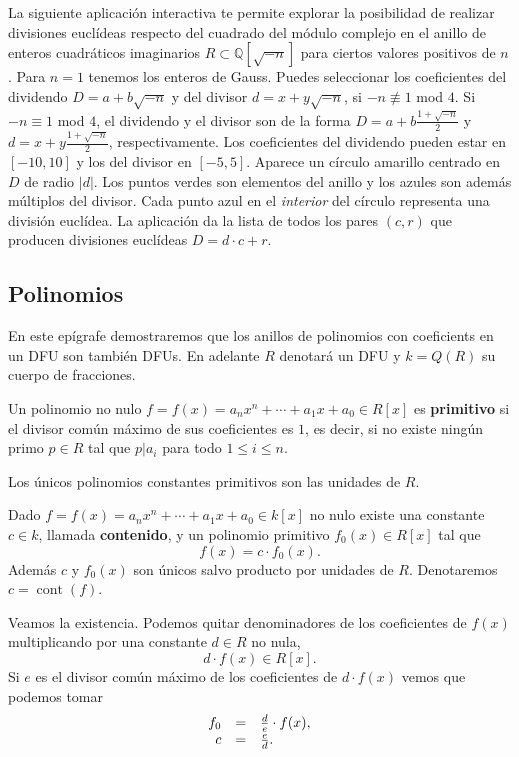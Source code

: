 La siguiente aplicación interactiva te permite explorar la posibilidad
de realizar divisiones euclídeas respecto del cuadrado del módulo
complejo en el anillo de enteros cuadráticos imaginarios
\(R\subset\mathbb Q[\sqrt{-n}]\) para ciertos valores positivos de
\(n\). Para \(n=1\) tenemos los enteros de Gauss. Puedes seleccionar los
coeficientes del dividendo \(D=a+b\sqrt{-n}\) y del divisor
\(d=x+y\sqrt{-n}\), si \(-n\not\equiv 1\) mod \(4\). Si \(-n\equiv 1\)
mod \(4\), el dividendo y el divisor son de la forma
\(D=a+b\frac{1+\sqrt{-n}}{2}\) y \(d=x+y\frac{1+\sqrt{-n}}{2}\),
respectivamente. Los coeficientes del dividendo pueden estar en
\([-10,10]\) y los del divisor en \([-5,5]\). Aparece un círculo
amarillo centrado en \(D\) de radio \(|d|\). Los puntos verdes son
elementos del anillo y los azules son además múltiplos del divisor. Cada
punto azul en el \emph{interior} del círculo representa una división
euclídea. La aplicación da la lista de todos los pares \((c,r)\) que
producen divisiones euclídeas \(D=d\cdot c+r\).

\hypertarget{polinomios}{%
\subsection{Polinomios}\label{polinomios}}

En este epígrafe demostraremos que los anillos de polinomios con
coeficients en un DFU son también DFUs. En adelante \(R\) denotará un
DFU y \(k=Q( R )\) su cuerpo de fracciones.


Un polinomio no nulo \(f=f(x)=a_nx^n+\cdots+a_1x+a_0\in R[x]\) es
\textbf{primitivo} si el divisor común máximo de sus coeficientes es
\(1\), es decir, si no existe ningún primo \(p\in R\) tal que \(p|a_i\)
para todo \(1\leq i\leq n\). 

Los únicos polinomios constantes primitivos son las unidades de \(R\).


Dado \(f=f(x)=a_nx^n+\cdots+a_1x+a_0\in k[x]\) no nulo existe una
constante \(c\in k\), llamada \textbf{contenido}, y un polinomio
primitivo \(f_0(x)\in R[x]\) tal que \[f(x)=c\cdot f_0(x).\] Además
\(c\) y \(f_0(x)\) son únicos salvo producto por unidades de \(R\).
Denotaremos \(c=\operatorname{cont}(f)\). 


Veamos la existencia. Podemos quitar denominadores de los coeficientes
de \(f(x)\) multiplicando por una constante \(d\in R\) no nula,
\[d\cdot f(x)\in R[x].\] Si \(e\) es el divisor común máximo de los
coeficientes de \(d\cdot f(x)\) vemos que podemos tomar
\[\begin{array}{rcl}
f_0&=&\frac{d}{e}\cdot f(x),\cr
c&=&\frac{e}{d}.
\end{array}\]

